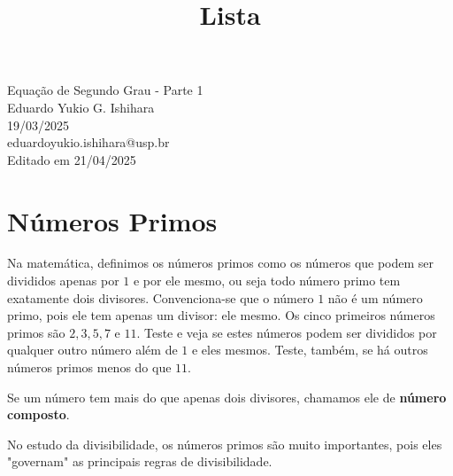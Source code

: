 \documentclass[12pt]{report}
\title{Lista}
\newcommand{\1}{\faThermometerEmpty}
\newcommand{\2}{\faThermometerQuarter}
\newcommand{\3}{\faThermometerHalf}
\newcommand{\4}{\faThermometerThreeQuarters}
\newcommand{\5}{\faThermometerFull}
\begin{document}
\begin{center}
{\Large Equação de Segundo Grau - Parte 1} \\ %
\vspace{1mm}
Eduardo Yukio G. Ishihara \\ 19/03/2025 \\ %
{\footnotesize eduardoyukio.ishihara@usp.br \\
Editado em 21/04/2025} %
\end{center}
\vspace{5mm}

\section*{Números Primos}
Na matemática, definimos os números primos como os números que podem ser divididos apenas por $1$ e por ele mesmo, ou seja todo número primo tem exatamente dois divisores. Convenciona-se que o número $1$ não é um número primo, pois ele tem apenas um divisor: ele mesmo. Os cinco primeiros números primos são $2,3,5,7$ e $11$. Teste e veja se estes números podem ser divididos por qualquer outro número além de $1$ e eles mesmos. Teste, também, se há outros números primos menos do que $11$.

Se um número tem mais do que apenas dois divisores, chamamos ele de \textbf{número composto}. 

No estudo da divisibilidade, os números primos são muito importantes, pois eles "governam" as principais regras de divisibilidade.
\end{document}
